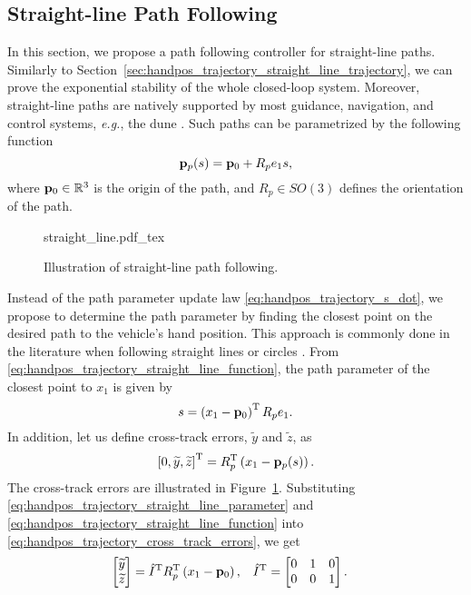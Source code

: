 \subsection{Straight-line Path Following}
\label{sec:handpos_trajectory_straight_line_path}
In this section, we propose a path following controller for straight-line paths.
Similarly to Section~\ref{sec:handpos_trajectory_straight_line_trajectory}, we can prove the exponential stability of the whole closed-loop system.
Moreover, straight-line paths are natively supported by most guidance, navigation, and control systems, \emph{e.g.}, the \acrfull{dune} \cite{dune}.
Such paths can be parametrized by the following function
\begin{equation}
    \mathbf{p}_p(s) = \mathbf{p}_0 + R_p e_1 s, \label{eq:handpos_trajectory_straight_line_function}
\end{equation}
where $\mathbf{p}_0 \in \mathbb{R}^3$ is the origin of the path, and $R_{p} \in SO(3)$ defines the orientation of the path.

\begin{figure}[tb]
    \centering
    \def\svgwidth{0.6\textwidth}
    {straight_line.pdf_tex}
    \caption{Illustration of straight-line path following.}
    \label{fig:straight_line}
\end{figure}

Instead of the path parameter update law \eqref{eq:handpos_trajectory_s_dot}, we propose to determine the path parameter by finding the closest point on the desired path to the vehicle's hand position.
This approach is commonly done in the literature when following straight lines or circles \cite{breivik_path_following_2004}.
From \eqref{eq:handpos_trajectory_straight_line_function}, the path parameter of the closest point to $x_1$ is given by
\begin{equation}
    s = \left(x_1 - \mathbf{p}_0\right)^{\mathrm{T}} R_p e_1. \label{eq:handpos_trajectory_straight_line_parameter}
\end{equation}
In addition, let us define cross-track errors, $\widetilde{y}$ and $\widetilde{z}$, as
\begin{equation}
    \left[0, \widetilde{y}, \widetilde{z}\right]^{\mathrm{T}} = R_p^{\mathrm{T}} \left(x_1 - \mathbf{p}_p(s)\right). \label{eq:handpos_trajectory_cross_track_errors}
\end{equation}
The cross-track errors are illustrated in Figure~\ref{fig:straight_line}.
Substituting \eqref{eq:handpos_trajectory_straight_line_parameter} and \eqref{eq:handpos_trajectory_straight_line_function} into \eqref{eq:handpos_trajectory_cross_track_errors}, we get
\begin{align}
    \begin{bmatrix} \widetilde{y} \\ \widetilde{z} \end{bmatrix} &= \hat{I}^{\mathrm{T}} R_p^{\mathrm{T}} \left(x_1 - \mathbf{p}_0\right), &
    \hat{I}^{\mathrm{T}} &= \begin{bmatrix} 0 & 1 & 0 \\ 0 & 0 & 1 \end{bmatrix}.
\end{align}

